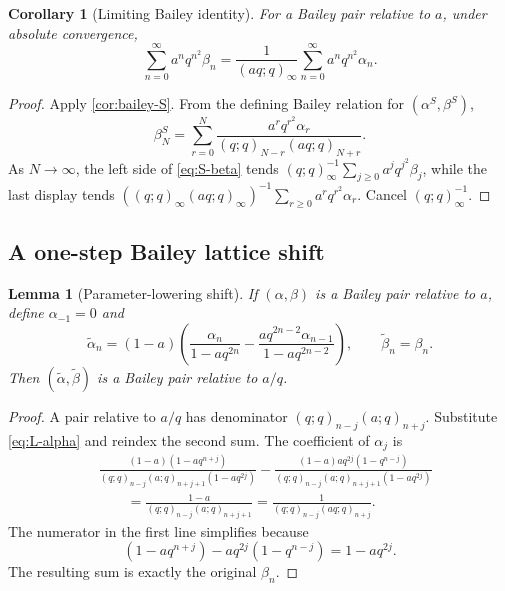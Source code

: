 \documentclass[11pt]{article}
\theoremstyle{blueplain}
\newtheorem{lemma}[theorem]{Lemma}
\newtheorem{corollary}[theorem]{Corollary}
\theoremstyle{bluedef}
\begin{document}
\begin{corollary}[Limiting Bailey identity]\label{cor:limiting-bailey}
For a Bailey pair relative to $a$, under absolute convergence,
\begin{equation}\label{eq:limiting-bailey}
\sum_{n=0}^{\infty}a^nq^{n^2}\beta_n
=\frac1{(aq;q)_\infty}
\sum_{n=0}^{\infty}a^nq^{n^2}\alpha_n.
\end{equation}
\end{corollary}

\begin{proof}
Apply \cref{cor:bailey-S}.  From the defining Bailey relation for $(\alpha^S,\beta^S)$,
\[
\beta_N^S=\sum_{r=0}^{N}
\frac{a^rq^{r^2}\alpha_r}{(q;q)_{N-r}(aq;q)_{N+r}}.
\]
As $N\to\infty$, the left side of \eqref{eq:S-beta} tends
\(
(q;q)_\infty^{-1}\sum_{j\ge0}a^jq^{j^2}\beta_j\), while the last display tends
\(
((q;q)_\infty(aq;q)_\infty)^{-1}
\sum_{r\ge0}a^rq^{r^2}\alpha_r
\).
Cancel $(q;q)_\infty^{-1}$.
\end{proof}

\subsection{A one-step Bailey lattice shift}

\begin{lemma}[Parameter-lowering shift]\label{lem:bailey-L}
If $(\alpha,\beta)$ is a Bailey pair relative to $a$, define $\alpha_{-1}=0$ and
\begin{equation}\label{eq:L-alpha}
\widetilde\alpha_n=(1-a)
\left(
\frac{\alpha_n}{1-aq^{2n}}
-\frac{aq^{2n-2}\alpha_{n-1}}{1-aq^{2n-2}}
\right),
\qquad
\widetilde\beta_n=\beta_n.
\end{equation}
Then $(\widetilde\alpha,\widetilde\beta)$ is a Bailey pair relative to $a/q$.
\end{lemma}

\begin{proof}
A pair relative to $a/q$ has denominator $(q;q)_{n-j}(a;q)_{n+j}$.  Substitute \eqref{eq:L-alpha} and reindex the second sum.  The coefficient of $\alpha_j$ is
\begin{align*}
&\frac{(1-a)(1-aq^{n+j})}
{(q;q)_{n-j}(a;q)_{n+j+1}(1-aq^{2j})}
-\frac{(1-a)aq^{2j}(1-q^{n-j})}
{(q;q)_{n-j}(a;q)_{n+j+1}(1-aq^{2j})}\\
&\qquad=\frac{1-a}{(q;q)_{n-j}(a;q)_{n+j+1}}
=\frac1{(q;q)_{n-j}(aq;q)_{n+j}}.
\end{align*}
The numerator in the first line simplifies because
\[
(1-aq^{n+j})-aq^{2j}(1-q^{n-j})=1-aq^{2j}.
\]
The resulting sum is exactly the original $\beta_n$.
\end{proof}
\end{document}
